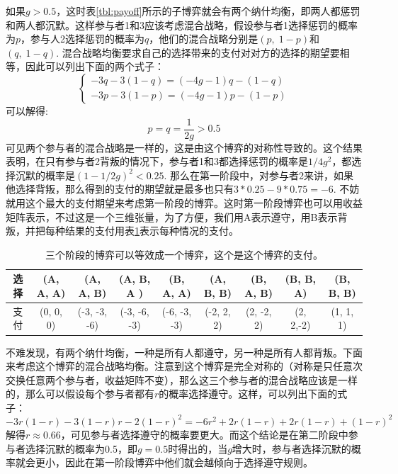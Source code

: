 \documentclass[lang=cn,11pt]{elegantpaper}
\begin{document}
如果$g>0.5$，这时表\ref{tbl:payoff}所示的子博弈就会有两个纳什均衡，即两人都惩罚和两人都沉默。这样参与者1和3应该考虑混合战略，假设参与者1选择惩罚的概率为$p$，参与人2选择惩罚的概率为$q$，他们的混合战略分别是$(p,\;1-p)$和$(q,\;1-q)$. 混合战略均衡要求自己的选择带来的支付对对方的选择的期望要相等，因此可以列出下面的两个式子：
\begin{equation}
\left\{
\begin{split}
-3q-3(1-q)=(-4g-1)q-(1-q)\\
-3p-3(1-p)=(-4g-1)p-(1-p)
\end{split}
\right.
\end{equation}
可以解得:
\begin{equation}
p=q=\frac{1}{2g}>0.5
\end{equation}
可见两个参与者的混合战略是一样的，这是由这个博弈的对称性导致的。这个结果表明，在只有参与者2背叛的情况下，参与者1和3都选择惩罚的概率是$1/4g^2$，都选择沉默的概率是$(1-1/2g)^2<0.25$. 那么在第一阶段中，对参与者2来讲，如果他选择背叛，那么得到的支付的期望就是最多也只有$3*0.25-9*0.75=-6$. 不妨就用这个最大的支付期望来考虑第一阶段的博弈。这时第一阶段博弈也可以用收益矩阵表示，不过这是一个三维张量，为了方便，我们用A表示遵守，用B表示背叛，并把每种结果的支付用表\ref{tbl:payoff2}表示每种情况的支付。
\begin{table}[htb] 
	\centering 
	\begin{tabular}{c|cccccccc} 
		选择 & (A, A, A)  &(A, A, B)& (A, B, A )& (B, A, A) & (A, B, B)  & (B, A, B)  & (B, B, A)  & (B, B, B)  \\
		\hline
		支付 &   (0, 0, 0)  &(-3, -3, -6)  & (-3, -6, -3)  &   (-6, -3, -3)  &   (-2, 2, 2)  &  (2, -2, 2)  &  (2, 2,-2)  &   (1, 1, 1) \\
	\end{tabular} 
	\caption{三个阶段的博弈可以等效成一个博弈，这个是这个博弈的支付。\label{tbl:payoff2}} 
\end{table}

不难发现，有两个纳什均衡，一种是所有人都遵守，另一种是所有人都背叛。下面来考虑这个博弈的混合战略均衡。注意到这个博弈是完全对称的（对称是只任意次交换任意两个参与者，收益矩阵不变），那么这三个参与者的混合战略应该是一样的，那么可以假设每个参与者都有$r$的概率选择遵守。这样，可以列出下面的式子：
\begin{equation}
-3r(1-r)-3(1-r)r-2(1-r)^2=-6r^2+2r(1-r)+2r(1-r)+(1-r)^2
\end{equation}
解得$r\approx 0.66$，可见参与者选择遵守的概率要更大。而这个结论是在第二阶段中参与者选择沉默的概率为0.5，即$g=0.5$时得出的，当$g$增大时，参与者选择沉默的概率就会更小，因此在第一阶段博弈中他们就会越倾向于选择遵守规则。
\end{document}
